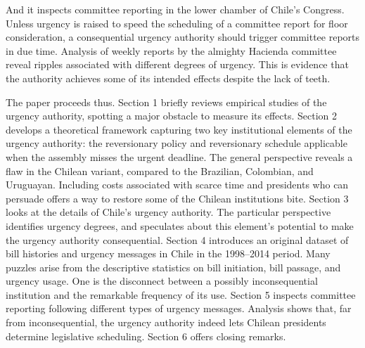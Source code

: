 \documentclass[letter,12pt]{article}
\begin{document}
And it inspects committee reporting in the lower chamber of Chile's Congress. Unless urgency is raised to speed the scheduling of a committee report for floor consideration, a consequential urgency authority should trigger committee reports in due time. Analysis of weekly reports by the almighty Hacienda committee reveal ripples associated with different degrees of urgency. This is evidence that the authority achieves some of its intended effects despite the lack of teeth.  


The paper proceeds thus. Section 1 briefly reviews empirical studies of the urgency authority, spotting a major obstacle to measure its effects. Section 2 develops a theoretical framework capturing two key institutional elements of the urgency authority: the reversionary policy and reversionary schedule applicable when the assembly misses the urgent deadline. The general perspective reveals a flaw in the Chilean variant, compared to the Brazilian, Colombian, and Uruguayan. Including costs associated with scarce time and presidents who can persuade offers a way to restore some of the Chilean institutions bite. Section 3 looks at the details of Chile's urgency authority. The particular perspective identifies urgency degrees, and speculates about this element's potential to make the urgency authority consequential. Section 4 introduces an original dataset of bill histories and urgency messages in Chile in the 1998--2014 period. Many puzzles arise from the descriptive statistics on bill initiation, bill passage, and urgency usage. One is the disconnect between a possibly inconsequential institution and the remarkable frequency of its use. Section 5 inspects committee reporting following different types of urgency messages. Analysis shows that, far from inconsequential, the urgency authority indeed lets Chilean presidents determine legislative scheduling. Section 6 offers closing remarks. 
\end{document}
